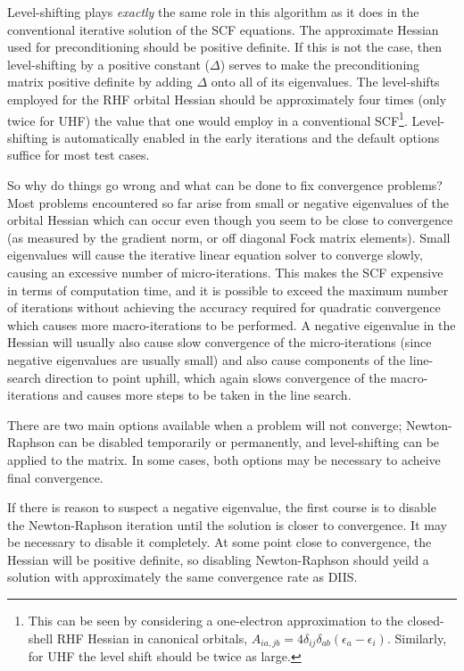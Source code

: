 Level-shifting plays {\em exactly} the same role in this algorithm as
it does in the conventional iterative solution of the SCF equations.
The approximate Hessian used for preconditioning should be positive
definite.  If this is not the case, then level-shifting by a positive
constant ($\Delta$) serves to make the preconditioning matrix positive
definite by adding $\Delta$ onto all of its eigenvalues.  The
level-shifts employed for the RHF orbital Hessian should be
approximately four times (only twice for UHF) the value that one would
employ in a conventional SCF\footnote{This can be seen by considering
  a one-electron approximation to the closed-shell RHF Hessian in
  canonical orbitals, $A_{ia,jb} = 4 \delta_{ij} \delta_{ab}
  (\epsilon_a - \epsilon_i)$.  Similarly, for UHF the level shift
  should be twice as large.}.  Level-shifting is automatically enabled
in the early iterations and the default options suffice for most test
cases.

So why do things go wrong and what can be done to fix convergence
problems?  Most problems encountered so far arise from small or
negative eigenvalues of the orbital Hessian which can occur even
though you seem to be close to convergence (as measured by the
gradient norm, or off diagonal Fock matrix elements).  Small
eigenvalues will cause the iterative linear equation solver to
converge slowly, causing an excessive number of micro-iterations.
This makes the SCF expensive in terms of computation time, and it is
possible to exceed the maximum number of iterations without achieving
the accuracy required for quadratic convergence which causes more
macro-iterations to be performed.  A negative eigenvalue in the
Hessian will usually also cause slow convergence of the
micro-iterations (since negative eigenvalues are usually small) and
also cause components of the line-search direction to point uphill,
which again slows convergence of the macro-iterations and causes more
steps to be taken in the line search.

There are two main options available when a problem will not converge;
Newton-Raphson can be disabled temporarily or permanently, and
level-shifting can be applied to the matrix.  In some cases, both
options may be necessary to acheive final convergence.

If there is reason to suspect a negative eigenvalue, the first course
is to disable the Newton-Raphson iteration until the solution is
closer to convergence.  It may be necessary to disable it completely.
At some point close to convergence, the Hessian will be positive
definite, so disabling Newton-Raphson should yeild a solution with
approximately the same convergence rate as DIIS.

